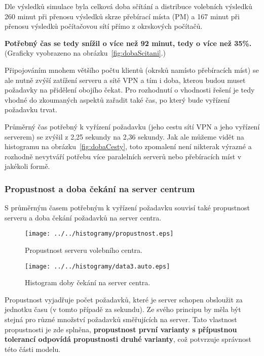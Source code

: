 \documentclass[12pt,a4paper,titlepage,final]{article}
\begin{document}
Dle výsledků simulace byla celková doba sčítání a distribuce volebních výsledků 260 minut při přenosu výsledků skrze přebírací místa (PM) a 167 minut při přenosu výsledků počítačovou sítí přímo z okrskových počítačů.

\textbf{Potřebný čas se tedy snížil o více než 92 minut, tedy o více než 35\%.} (Graficky vyobrazeno na obrázku~\ref{fig:dobaScitani}.)

Připojováním mnohem většího počtu klientů (okrsků namísto přebíracích míst) se ale nutně zvýší zatížení serveru a sítě VPN a tím i doba, kterou budou muset požadavky na přidělení obojího čekat. Pro rozhodnutí o vhodnosti řešení je tedy vhodné do zkoumaných aspektů zařadit také čas, po který bude vyřízení požadavku trvat.

Průměrný čas potřebný k vyřízení požadavku (jeho cestu sítí VPN a jeho vyřízení serverem) se zvýšil z 2,25 sekundy na 2,36 sekundy. Jak ale můžeme vidět na histogramu na obrázku~\ref{fig:dobaCesty}, toto zpomalení není nikterak výrazné a rozhodně nevytváří potřebu více paralelních serverů nebo přebíracích míst v jakékoli formě.

\subsubsection{Propustnost a doba čekání na server centrum}

S průměrným časem potřebným k vyřízení požadavku souvisí také propustnost serveru a doba čekání požadavků na server centra.

\begin{figure}[H]
\centering
\begin{minipage}{.49\textwidth}
  \centering
  \texttt{[image: ../../histogramy/propustnost.eps]}
  \caption{Propustnost serveru volebního centra.}
  \label{fig:propustnost}
\end{minipage}
\hfill
\begin{minipage}{.49\textwidth}
  \centering
  \texttt{[image: ../../histogramy/data3.auto.eps]}
  \caption{Histogram doby čekání na server centra.}
  \label{fig:data3}
\end{minipage}
\end{figure}

Propustnost vyjadřuje počet požadavků, které je server schopen obsloužit za jednotku času (v tomto případě za sekundu). Ze svého principu by měla být stejná pro různé množství požadavků směřujících na server. Tato vlastnost propustnosti je zde splněna, \textbf{propustnost první varianty s přípustnou tolerancí odpovídá propustnosti druhé varianty}, což potvrzuje správnost této části modelu.
\end{document}
